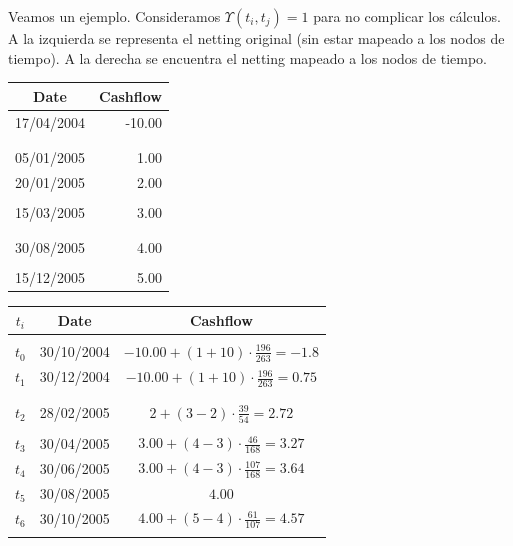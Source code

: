 Veamos un ejemplo. Consideramos $\Upsilon(t_i,t_j)=1$ para no complicar los c\'alculos.
A la izquierda se representa el netting original (sin estar mapeado a los nodos de
tiempo). A la derecha se encuentra el netting mapeado a los nodos de tiempo.
\newline
\newline
\begin{minipage}[c]{0.4\columnwidth}%
\centering
\begin{tabular}{c|r}
\textbf{Date} & \textbf{Cashflow} \\
\hline
17/04/2004 & -10.00 \\
           &        \\
           &        \\
05/01/2005 &   1.00 \\
20/01/2005 &   2.00 \\
           &        \\
15/03/2005 &   3.00 \\
           &        \\
           &        \\
30/08/2005 &   4.00 \\
           &        \\
15/12/2005 &   5.00 \\
\end{tabular}
\end{minipage}%
\begin{minipage}[c]{0.6\columnwidth}%
\centering
\begin{tabular}{c|c|c}
\textbf{$t_i$} & \textbf{Date}  & \textbf{Cashflow} \\
\hline
      &            &      \\
$t_0$ & 30/10/2004 & $-10.00 + (1+10) \cdot \frac{196}{263} =  -1.8$\\
$t_1$ & 30/12/2004 & $-10.00 + (1+10) \cdot \frac{196}{263} =  0.75$ \\
      &            &      \\
      &            &      \\
$t_2$ & 28/02/2005 & $2 + (3-2) \cdot \frac{39}{54} = 2.72$ \\
      &            &      \\
$t_3$ & 30/04/2005 & $3.00 + (4-3) \cdot \frac{46}{168} = 3.27$ \\
$t_4$ & 30/06/2005 & $3.00 + (4-3) \cdot \frac{107}{168} = 3.64$ \\
$t_5$ & 30/08/2005 & $4.00$ \\
$t_6$ & 30/10/2005 & $4.00 + (5-4) \cdot \frac{61}{107} = 4.57$ \\
      &            &      \\
\end{tabular}
\end{minipage}%

